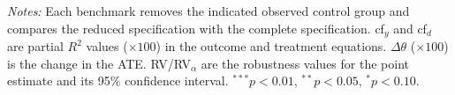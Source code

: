 \begin{landscape}
\begin{table}[p]
\par\vspace{3pt}
\begin{minipage}{\linewidth}\footnotesize \textit{Notes:} Each benchmark removes the indicated observed control group and compares the reduced specification with the complete specification. cf$_y$ and cf$_d$ are partial $R^2$ values ($\times100$) in the outcome and treatment equations. $\Delta\theta$ ($\times100$) is the change in the ATE. RV/RV$_\alpha$ are the robustness values for the point estimate and its 95\% confidence interval. $^{***}p<0.01$, $^{**}p<0.05$, $^{*}p<0.10$.\end{minipage}
\end{table}
\end{landscape}
